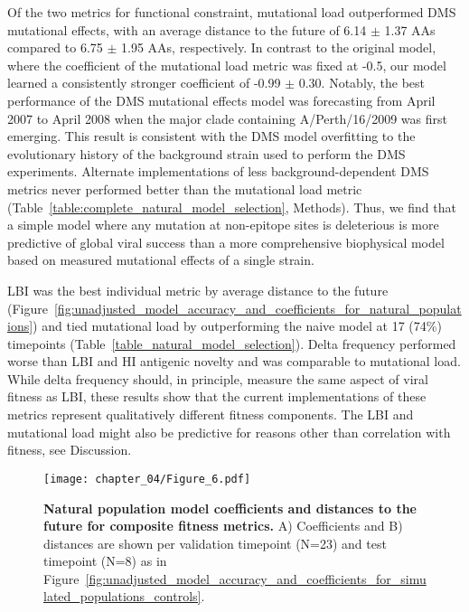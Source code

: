Of the two metrics for functional constraint, mutational load outperformed DMS mutational effects, with an average distance to the future of 6.14 $\pm$ 1.37 AAs compared to 6.75 $\pm$ 1.95 AAs, respectively.
In contrast to the original \cite{Luksza:2014hj} model, where the coefficient of the mutational load metric was fixed at -0.5, our model learned a consistently stronger coefficient of -0.99 $\pm$ 0.30.
Notably, the best performance of the DMS mutational effects model was forecasting from April 2007 to April 2008 when the major clade containing A/Perth/16/2009 was first emerging.
This result is consistent with the DMS model overfitting to the evolutionary history of the background strain used to perform the DMS experiments.
Alternate implementations of less background-dependent DMS metrics never performed better than the mutational load metric (Table~\ref{table:complete_natural_model_selection}, Methods).
Thus, we find that a simple model where any mutation at non-epitope sites is deleterious is more predictive of global viral success than a more comprehensive biophysical model based on measured mutational effects of a single strain.

LBI was the best individual metric by average distance to the future (Figure~\ref{fig:unadjusted_model_accuracy_and_coefficients_for_natural_populations}) and tied mutational load by outperforming the naive model at 17 (74\%) timepoints (Table~\ref{table_natural_model_selection}).
Delta frequency performed worse than LBI and HI antigenic novelty and was comparable to mutational load.
While delta frequency should, in principle, measure the same aspect of viral fitness as LBI, these results show that the current implementations of these metrics represent qualitatively different fitness components.
The LBI and mutational load might also be predictive for reasons other than correlation with fitness, see Discussion.

\begin{figure}
  \texttt{[image: chapter\_04/Figure\_6.pdf]}
  \caption[{Natural population model coefficients and distances to the future for composite fitness metrics.}]{
    {\bf Natural population model coefficients and distances to the future for composite fitness metrics.}
    A) Coefficients and B) distances are shown per validation timepoint (N=23) and test timepoint (N=8) as in Figure~\ref{fig:unadjusted_model_accuracy_and_coefficients_for_simulated_populations_controls}.
  }
  \label{fig:unadjusted_composite_model_accuracy_and_coefficients_for_natural_populations}
\end{figure}

